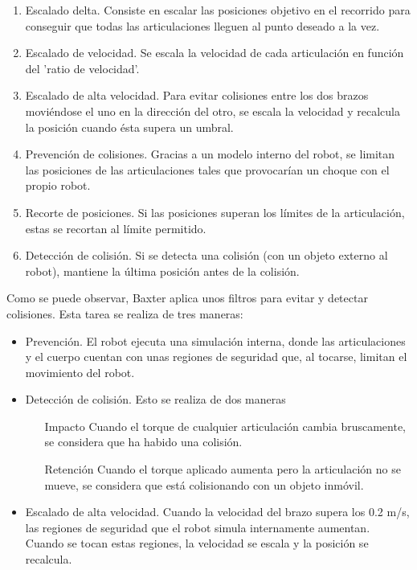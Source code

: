 \begin{enumerate}
\item {Escalado delta.} Consiste en escalar las posiciones objetivo en el recorrido para conseguir que todas las articulaciones lleguen al punto deseado a la vez.
\item {Escalado de velocidad.} Se escala la velocidad de cada articulación en función del 'ratio de velocidad'.
\item {Escalado de alta velocidad.} Para evitar colisiones entre los dos brazos moviéndose el uno en la dirección del otro, se escala la velocidad y recalcula la posición cuando ésta supera un umbral.
\item {Prevención de colisiones.} Gracias a un modelo interno del robot, se limitan las posiciones de las articulaciones tales que provocarían un choque con el propio robot.
\item {Recorte de posiciones.} Si las posiciones superan los límites de la articulación, estas se recortan al límite permitido.
\item {Detección de colisión.} Si se detecta una colisión (con un objeto externo al robot), mantiene la última posición antes de la colisión.
\end{enumerate}

Como se puede observar, Baxter aplica unos filtros para evitar y detectar colisiones. Esta tarea se realiza de tres maneras:

\begin{itemize}
\item {Prevención.} El robot ejecuta una simulación interna, donde las articulaciones y el cuerpo cuentan con unas regiones de seguridad que, al tocarse, limitan el movimiento del robot.
\item {Detección de colisión.} Esto se realiza de dos maneras
\begin{enumerate}
\item [Impacto] Cuando el torque de cualquier articulación cambia bruscamente, se considera que ha habido una colisión.
\item [Retención] Cuando el torque aplicado aumenta pero la articulación no se mueve, se considera que está colisionando con un objeto inmóvil.
\end{enumerate} 
\item {Escalado de alta velocidad.} Cuando la velocidad del brazo supera los 0.2 m/s, las regiones de seguridad que el robot simula internamente aumentan. Cuando se tocan estas regiones, la velocidad se escala y la posición se recalcula.
\end{itemize}

